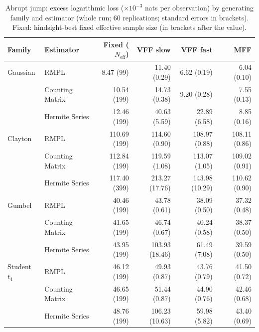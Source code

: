 \begin{table}[htbp]
\centering
\small
\caption{Abrupt jump: excess logarithmic loss ($\times10^{-3}$ nats per observation) by generating family and estimator (whole run; 60 replications; standard errors in brackets). Fixed: hindsight-best fixed effective sample size (in brackets after the value).}
\label{tab:app-strategy-excess-jump}
\begin{tabular}{llrrrr}
\toprule
Family & Estimator & Fixed ($N_{\mathrm{eff}}$) & VFF slow & VFF fast & MFF \\
\midrule
Gaussian & RMPL & 8.47 (99) & 11.40 (0.29) & 6.62 (0.19) & 6.04 (0.10) \\
 & Counting Matrix & 10.54 (199) & 14.73 (0.38) & 9.20 (0.28) & 7.55 (0.13) \\
 & Hermite Series & 12.46 (199) & 40.63 (5.59) & 22.89 (6.58) & 8.85 (0.16) \\
\addlinespace
Clayton & RMPL & 110.69 (199) & 114.60 (0.90) & 108.97 (0.88) & 108.11 (0.86) \\
 & Counting Matrix & 112.84 (199) & 119.59 (1.08) & 113.07 (1.05) & 109.02 (0.91) \\
 & Hermite Series & 117.40 (399) & 213.27 (17.76) & 143.98 (10.29) & 110.62 (0.90) \\
\addlinespace
Gumbel & RMPL & 40.46 (199) & 43.78 (0.61) & 38.09 (0.50) & 37.32 (0.48) \\
 & Counting Matrix & 41.65 (199) & 46.74 (0.67) & 40.24 (0.58) & 38.37 (0.50) \\
 & Hermite Series & 43.95 (199) & 103.93 (18.46) & 61.49 (7.08) & 39.59 (0.50) \\
\addlinespace
Student $t_4$ & RMPL & 46.12 (199) & 49.93 (0.87) & 43.76 (0.79) & 41.50 (0.72) \\
 & Counting Matrix & 46.65 (199) & 51.44 (0.87) & 44.90 (0.76) & 42.46 (0.68) \\
 & Hermite Series & 48.76 (199) & 106.23 (10.63) & 59.98 (5.82) & 43.40 (0.69) \\
\bottomrule
\end{tabular}
\end{table}

